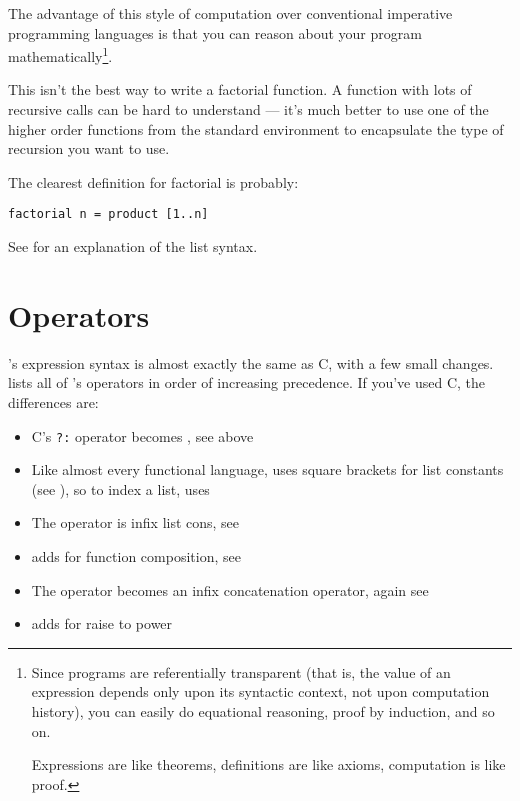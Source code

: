 The advantage of this style of computation over conventional imperative
programming languages is that you can reason about your program
mathematically\footnote{Since programs are referentially transparent (that
is, the value of an expression depends only upon its syntactic context,
not upon computation history), you can easily do equational reasoning,
proof by induction, and so on.

Expressions are like theorems, definitions are like axioms, computation
is like proof.}. 

This isn't the best way to write a factorial function. A function with lots
of recursive calls can be hard to understand --- it's much better to use one
of the higher order functions from the standard environment to encapsulate
the type of recursion you want to use.

The clearest definition for factorial is probably:

\begin{verbatim}
factorial n = product [1..n]
\end{verbatim}

\noindent
See  for an explanation of the list syntax.

\section{Operators}

\nip{}'s expression syntax is almost exactly the same as C,
with a few small changes.  lists all of 
\nip{}'s operators in order of increasing precedence. If you've used C, the
differences are:

\begin{itemize}

\item
	C's \verb+?:+ operator becomes , see above

\item
	Like almost every functional language, \nip{} uses square brackets
	for list constants (see ), so to index a
	list, \nip{} uses 

\item
	The \ct{:} operator is infix list cons, see 

\item
	\nip{} adds  for function composition, see 

\item
	The \ct{++} operator becomes an infix concatenation operator, again
	see 

\item
	\nip{} adds \ct{**} for raise to power

\end{itemize}

